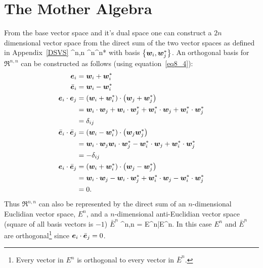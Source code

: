 \section{The Mother Algebra}

From the base vector space and it's 
dual space one can construct a $2n$ dimensional vector space from the direct sum of the two vector 
spaces as defined in Appendix~\ref{DSVS}
\be\label{eq8_6}
	\Re^{n,n} \equiv {}^{n}\oplus {}^{n*}
\ee
with basis $\left \{ {\bm{w}_{i},\bm{w}_{j}^{*}} \right \}$.  An orthogonal basis for $\Re^{n,n}$ can be constructed as follows (using
equation~\ref{eq8_4}):
\begin{align}
	\bm{e}_{i} &= \bm{w}_{i}+\bm{w}_{i}^{*} \label{eq8_7}\\
	\bar{\bm{e}}_{i} &= \bm{w}_{i}-\bm{w}_{i}^{*} \label{eq8_7a}\\
	\bm{e}_{i}\cdot\bm{e}_{j} &= \left ( {\bm{w}_{i}+\bm{w}_{i}^{*}} \right )\cdot\left ( {\bm{w}_{j}+\bm{w}_{j}^{*}} \right ) \nonumber \\
	                    &=  \bm{w}_{i}\cdot\bm{w}_{j}+\bm{w}_{i}\cdot\bm{w}_{j}^{*}+\bm{w}_{i}^{*}\cdot\bm{w}_{j}+
	                        \bm{w}_{i}^{*}\cdot\bm{w}_{j}^{*} \nonumber \\
	                    &= \delta_{ij} \label{eiej}\\
	\bar{\bm{e}}_{i}\cdot\bar{\bm{e}}_{j} &= \left ( {\bm{w}_{i}-\bm{w}_{i}^{*}} \right )\cdot\left ( {\bm{w}_{j}\bm{w}_{j}^{*}} \right ) \nonumber \\
	                    &=  \bm{w}_{i}\cdot\bm{w}_{j}\bm{w}_{i}\cdot\bm{w}_{j}^{*}-\bm{w}_{i}^{*}\cdot\bm{w}_{j}+
	                        \bm{w}_{i}^{*}\cdot\bm{w}_{j}^{*} \nonumber \\
	                    &= -\delta_{ij} \label{beibej}\\
	\bm{e}_{i}\cdot\bar{\bm{e}}_{j} &= \left ( {\bm{w}_{i}+\bm{w}_{i}^{*}} \right )\cdot\left ( {\bm{w}_{j}-\bm{w}_{j}^{*}} \right ) \nonumber \\
	                    &=  \bm{w}_{i}\cdot\bm{w}_{j}-\bm{w}_{i}\cdot\bm{w}_{j}^{*}+\bm{w}_{i}^{*}\cdot\bm{w}_{j}-
	                        \bm{w}_{i}^{*}\cdot\bm{w}_{j}^{*} \nonumber \\
	                    &= 0. \label{eibej}	                    
\end{align}
Thus $\Re^{n,n}$ can also be represented by the direct sum of an $n$-dimensional Euclidian vector space, $E^{n}$,
and a $n$-dimensional anti-Euclidian vector space (square of all basis vectors is $-1$) $\bar{E}^{n}$
\be\label{eq8_12}
	\Re^{n,n} = E^{n}\oplus \bar{E}^{n}.
\ee
In this case $E^{n}$ and $\bar{E}^{n}$ are orthogonal\footnote{Every vector in $E^{n}$
is orthogonal to every vector in $\bar{E}^{n}$.} since $\bm{e}_{i}\cdot\bar{\bm{e}}_{j} = 0$.
